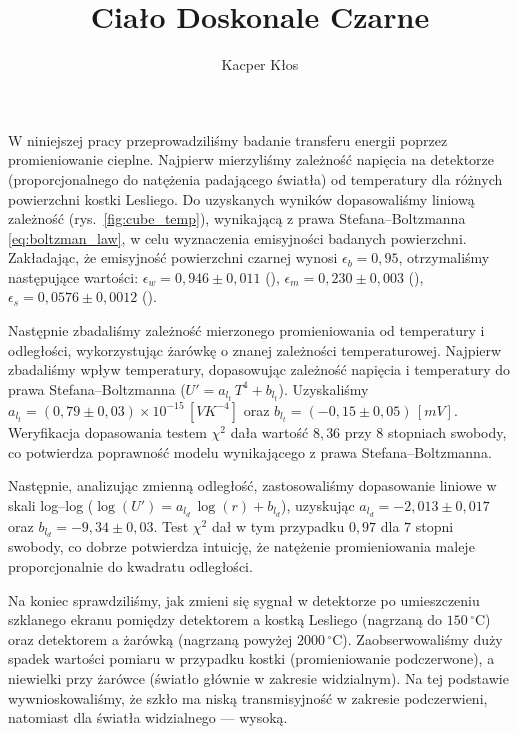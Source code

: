 \documentclass[12pt]{article}
\title{Ciało Doskonale Czarne}
\author{Kacper Kłos}
\begin{document}
\maketitle

W niniejszej pracy przeprowadziliśmy badanie transferu energii poprzez promieniowanie cieplne. Najpierw mierzyliśmy zależność napięcia na detektorze (proporcjonalnego do natężenia padającego światła) od temperatury dla różnych powierzchni kostki Lesliego. Do uzyskanych wyników dopasowaliśmy liniową zależność (rys.~\ref{fig:cube_temp}), wynikającą z prawa Stefana–Boltzmanna \eqref{eq:boltzman_law}, w celu wyznaczenia emisyjności badanych powierzchni. Zakładając, że emisyjność powierzchni czarnej wynosi $\epsilon_b = 0{,}95$, otrzymaliśmy następujące wartości: $\epsilon_w = 0{,}946 \pm 0{,}011$ (), $\epsilon_m = 0{,}230 \pm 0{,}003$ (), $\epsilon_s = 0{,}0576 \pm 0{,}0012$ ().

Następnie zbadaliśmy zależność mierzonego promieniowania od temperatury i odległości, wykorzystując żarówkę o znanej zależności temperaturowej. Najpierw zbadaliśmy wpływ temperatury, dopasowując zależność napięcia i temperatury do prawa Stefana–Boltzmanna ($U' = a_{l_t}\,T^4 + b_{l_t}$). Uzyskaliśmy $a_{l_t} = (0{,}79 \pm 0{,}03) \times 10^{-15}\,[VK^{-4}]$ oraz $b_{l_t} = (-0{,}15 \pm 0{,}05)\,[mV]$.
Weryfikacja dopasowania testem $\chi^2$ dała wartość $8{,}36$ przy $8$ stopniach swobody, co potwierdza poprawność modelu wynikającego z prawa Stefana–Boltzmanna. 

Następnie, analizując zmienną odległość, zastosowaliśmy dopasowanie liniowe w skali log–log ($\log(U') = a_{l_d}\,\log(r) + b_{l_d}$), uzyskując $a_{l_d} = -2{,}013 \pm 0{,}017$ oraz $b_{l_d} = -9{,}34 \pm 0{,}03$.
Test $\chi^2$ dał w tym przypadku $0{,}97$ dla $7$ stopni swobody, co dobrze potwierdza intuicję, że natężenie promieniowania maleje proporcjonalnie do kwadratu odległości. 

Na koniec sprawdziliśmy, jak zmieni się sygnał w detektorze po umieszczeniu szklanego ekranu pomiędzy detektorem a kostką Lesliego (nagrzaną do $150\,^\circ\mathrm{C}$) oraz detektorem a żarówką (nagrzaną powyżej $2000\,^\circ\mathrm{C}$). Zaobserwowaliśmy duży spadek wartości pomiaru w przypadku kostki (promieniowanie podczerwone), a niewielki przy żarówce (światło głównie w zakresie widzialnym). Na tej podstawie wywnioskowaliśmy, że szkło ma niską transmisyjność w zakresie podczerwieni, natomiast dla światła widzialnego — wysoką.
\end{document}
